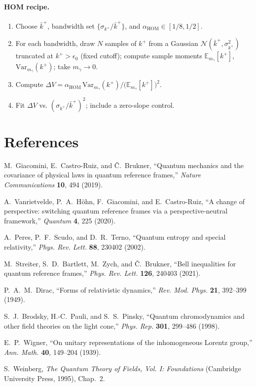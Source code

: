 \documentclass[aps,11pt]{article}
\newcommand{\Var}{\mathrm{Var}}
\newcommand{\E}{\mathbb{E}}
\newcommand{\kplus}{k^{+}}
\newcommand{\kbar}{\bar{k}^{+}}
\newcommand{\alphahom}{\alpha_{\text{HOM}}}
\begin{document}
\paragraph{HOM recipe.}
\begin{enumerate}[leftmargin=1.25em]
\item Choose \(\kbar\), bandwidth set \(\{\sigma_{\kplus}/\kbar\}\), and \(\alphahom\in[1/8,1/2]\).
\item For each bandwidth, draw \(N\) samples of \(\kplus\) from a Gaussian \(\mathcal N(\kbar,\sigma_{\kplus}^{2})\) truncated at \(\kplus>\epsilon_0\) (fixed cutoff); compute sample moments \(\E_{m_\gamma}[\kplus]\), \(\Var_{m_\gamma}(\kplus)\); take \(m_\gamma\to0\).
\item Compute \(\Delta V=\alphahom\,\Var_{m_\gamma}(\kplus)/\big(\E_{m_\gamma}[\kplus]\big)^{2}\).
\item Fit \(\Delta V\) vs. \((\sigma_{\kplus}/\kbar)^{2}\); include a zero-slope control.
\end{enumerate}

\section{References}
\begin{thebibliography}{99}

M.~Giacomini, E.~Castro-Ruiz, and {\v C}.~Brukner,
``Quantum mechanics and the covariance of physical laws in quantum reference frames,''
\textit{Nature Communications} \textbf{10}, 494 (2019).

A.~Vanrietvelde, P.~A.~H{\"o}hn, F.~Giacomini, and E.~Castro-Ruiz,
``A change of perspective: switching quantum reference frames via a perspective-neutral framework,''
\textit{Quantum} \textbf{4}, 225 (2020).

A.~Peres, P.~F.~Scudo, and D.~R.~Terno,
``Quantum entropy and special relativity,''
\textit{Phys. Rev. Lett.} \textbf{88}, 230402 (2002).

M.~Streiter, S.~D.~Bartlett, M.~Zych, and {\v C}.~Brukner,
``Bell inequalities for quantum reference frames,''
\textit{Phys. Rev. Lett.} \textbf{126}, 240403 (2021).

P.~A.~M.~Dirac,
``Forms of relativistic dynamics,''
\textit{Rev. Mod. Phys.} \textbf{21}, 392--399 (1949).

S.~J.~Brodsky, H.-C.~Pauli, and S.~S.~Pinsky,
``Quantum chromodynamics and other field theories on the light cone,''
\textit{Phys. Rep.} \textbf{301}, 299--486 (1998).

E.~P.~Wigner,
``On unitary representations of the inhomogeneous Lorentz group,''
\textit{Ann. Math.} \textbf{40}, 149--204 (1939).

S.~Weinberg,
\textit{The Quantum Theory of Fields, Vol. I: Foundations}
(Cambridge University Press, 1995), Chap.~2.

\end{thebibliography}
\end{document}
